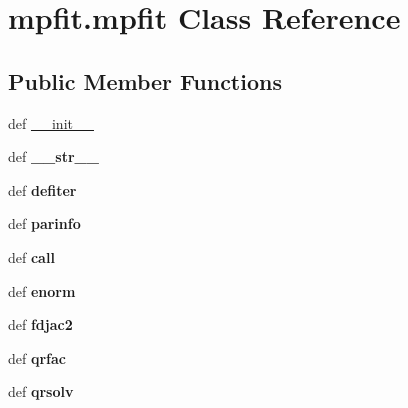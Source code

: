 \hypertarget{classmpfit_1_1mpfit}{\section{mpfit.\-mpfit Class Reference}
\label{classmpfit_1_1mpfit}
}
\subsection*{Public Member Functions}
\begin{DoxyCompactItemize}
\item 
def \hyperlink{classmpfit_1_1mpfit_a85f978dd465cf7e718286d24ae6c60a4}{\-\_\-\-\_\-init\-\_\-\-\_\-}
\item 
\hypertarget{classmpfit_1_1mpfit_a05677996f0b51ba1872c6da189a716b3}{def {\bfseries \-\_\-\-\_\-str\-\_\-\-\_\-}}\label{classmpfit_1_1mpfit_a05677996f0b51ba1872c6da189a716b3}

\item 
\hypertarget{classmpfit_1_1mpfit_a2642766f2780ad122bf6a8da506a3524}{def {\bfseries defiter}}\label{classmpfit_1_1mpfit_a2642766f2780ad122bf6a8da506a3524}

\item 
\hypertarget{classmpfit_1_1mpfit_a4044ca5a6e332785b83426fec482dcf9}{def {\bfseries parinfo}}\label{classmpfit_1_1mpfit_a4044ca5a6e332785b83426fec482dcf9}

\item 
\hypertarget{classmpfit_1_1mpfit_a4a57197c1a780d1802d635aaa071ca0c}{def {\bfseries call}}\label{classmpfit_1_1mpfit_a4a57197c1a780d1802d635aaa071ca0c}

\item 
\hypertarget{classmpfit_1_1mpfit_aacd12e70b3688a26daeece9c2d2f3bf2}{def {\bfseries enorm}}\label{classmpfit_1_1mpfit_aacd12e70b3688a26daeece9c2d2f3bf2}

\item 
\hypertarget{classmpfit_1_1mpfit_a4d85cdc05b2d972f319ec1c336337906}{def {\bfseries fdjac2}}\label{classmpfit_1_1mpfit_a4d85cdc05b2d972f319ec1c336337906}

\item 
\hypertarget{classmpfit_1_1mpfit_a58e4954f7b62f1e53b2119a3781e03fd}{def {\bfseries qrfac}}\label{classmpfit_1_1mpfit_a58e4954f7b62f1e53b2119a3781e03fd}

\item 
\hypertarget{classmpfit_1_1mpfit_a68e859946e64a6d998b7f48cd0949875}{def {\bfseries qrsolv}}\label{classmpfit_1_1mpfit_a68e859946e64a6d998b7f48cd0949875}


\end{DoxyCompactItemize}
